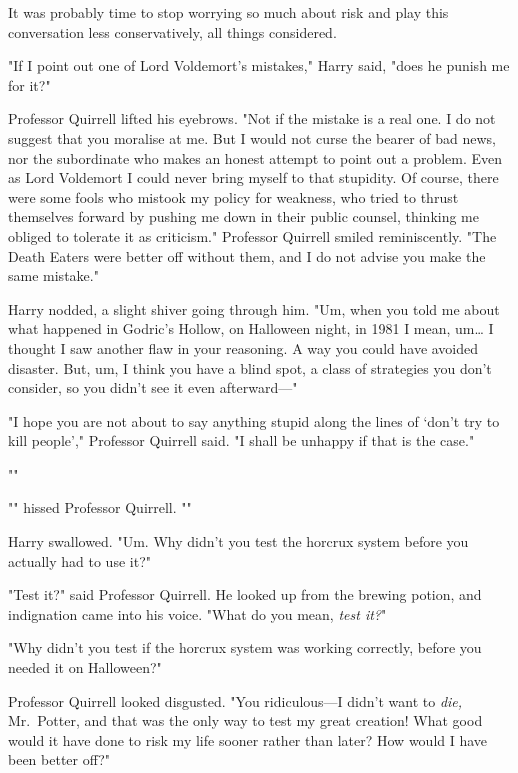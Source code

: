 It was probably time to stop worrying so much about risk and play this
conversation less conservatively, all things considered.

"If I point out one of Lord Voldemort's mistakes," Harry said, "does he punish
me for it?"

Professor Quirrell lifted his eyebrows. "Not if the mistake is a real one. I do
not suggest that you moralise at me. But I would not curse the bearer of bad
news, nor the subordinate who makes an honest attempt to point out a problem.
Even as Lord Voldemort I could never bring myself to that stupidity. Of course,
there were some fools who mistook my policy for weakness, who tried to thrust
themselves forward by pushing me down in their public counsel, thinking me
obliged to tolerate it as criticism." Professor Quirrell smiled reminiscently.
"The Death Eaters were better off without them, and I do not advise you make
the same mistake."

Harry nodded, a slight shiver going through him. "Um, when you told me about
what happened in Godric's Hollow, on Halloween night, in 1981 I mean,
um{\ldots} I thought I saw another flaw in your reasoning. A way you could have
avoided disaster. But, um, I think you have a blind spot, a class of strategies
you don't consider, so you didn't see it even afterward---"

"I hope you are not about to say anything stupid along the lines of `don't try
to kill people'," Professor Quirrell said. "I shall be unhappy if that is the
case."

""

"" hissed Professor Quirrell. ""

Harry swallowed. "Um. Why didn't you test the horcrux system before you
actually had to use it?"

"Test it?" said Professor Quirrell. He looked up from the brewing potion, and
indignation came into his voice. "What do you mean, \emph{test it?}"

"Why didn't you test if the horcrux system was working correctly, before you
needed it on Halloween?"

Professor Quirrell looked disgusted. "You ridiculous---I didn't want to
\emph{die,} Mr.~Potter, and that was the only way to test my great creation!
What good would it have done to risk my life sooner rather than later? How
would I have been better off?"

